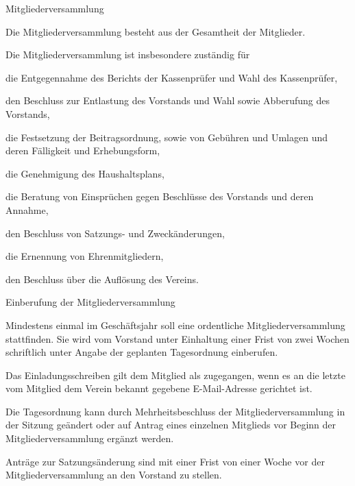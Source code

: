 \documentclass[11pt,a4paper,twoside,openany,article]{memoir}
\begin{document}
\begin{para}{Mitgliederversammlung}
  \label{p:mv}
  \item Die Mitgliederversammlung besteht aus der Gesamtheit der Mitglieder.
  \item Die Mitgliederversammlung ist insbesondere zuständig für
  \begin{subpara}
    \item die Entgegennahme des Berichts der Kassenprüfer und Wahl des Kassenprüfer,
    \item den Beschluss zur Entlastung des Vorstands und Wahl sowie Abberufung des Vorstands,
    \item die Festsetzung der Beitragsordnung, sowie von Gebühren und Umlagen und deren Fälligkeit und Erhebungsform,
    \item die Genehmigung des Haushaltsplans,
    \item die Beratung von Einsprüchen gegen Beschlüsse des Vorstands und deren Annahme,
    \item den Beschluss von Satzungs- und Zweckänderungen,
    \item die Ernennung von Ehrenmitgliedern,
    \item den Beschluss über die Auflösung des Vereins.
  \end{subpara}
\end{para}

\begin{para}{Einberufung der Mitgliederversammlung}
  \label{p:mveinberufung}
  \item Mindestens einmal im Geschäftsjahr soll eine ordentliche Mitgliederversammlung stattfinden. Sie wird vom Vorstand unter Einhaltung einer Frist von zwei Wochen schriftlich unter Angabe der geplanten Tagesordnung einberufen.
  \item Das Einladungsschreiben gilt dem Mitglied als zugegangen, wenn es an die letzte vom Mitglied dem Verein bekannt gegebene E-Mail-Adresse gerichtet ist.
  \item Die Tagesordnung kann durch Mehrheitsbeschluss der Mitgliederversammlung in der Sitzung geändert oder auf Antrag eines einzelnen Mitglieds vor Beginn der Mitgliederversammlung ergänzt werden.
  \item Anträge zur Satzungsänderung sind mit einer Frist von einer Woche vor der Mitgliederversammlung an den Vorstand zu stellen.
\end{para}
\end{document}
